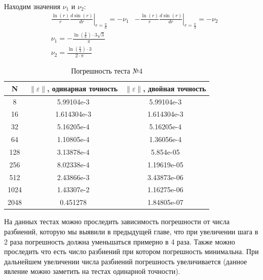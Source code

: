  Находим значения $ \nu_1 $ и $ \nu_2 $:
  \begin{align*}
		& \frac{\ln(r)}{r} \left. \frac{d\sin(r)}{dr}\right\vert_{r = \frac{\pi}{6}} = -\nu _1
		&-\frac{\ln(r)}{r} \left. \frac{d\sin(r)}{dr}\right\vert_{r = \frac{\pi}{3}} = -\nu_2 \\
    & \nu_1 = -\frac{\ln(\frac{\pi}{6}) \cdot 3\sqrt{3}}{\pi} \\
    &\nu_2 = \frac{\ln(\frac{\pi}{3})\cdot3}{2 \cdot \pi}
  \end{align*}
  \begin{table}[H]
    \centering
    \begin{tabular}{c | c | c}
      \toprule
      N & $ \left\lVert \varepsilon \right\rVert  $, одинарная точность & $ \left\lVert \varepsilon \right\rVert  $, двойная точность \\
      \midrule
      8 & 5.99104e-3 & 5.99104e-3\\
      16 & 1.614304e-3 & 1.614304e-3\\
      32 & 5.16205e-4 & 5.16205e-4\\
      64 & 1.10805e-4 & 1.36056e-4\\
      128 & 3.13878e-4 & 5.854e-05\\
      256 & 8.02338e-4 & 1.19619e-05\\
      512 & 2.43866e-3 & 3.43873e-06\\
      1024 & 1.43307e-2 & 1.16275e-06\\
      2048 & 0.451278 & 1.84805e-07\\
      \bottomrule
    \end{tabular}
    \caption{Погрешность теста №4}
  \end{table}

На данных тестах можно проследить зависимость погрешности от числа разбиений, которую мы выявили в предыдущей главе, что при увеличении шага
в 2 раза погрешность должна уменьшаться примерно в 4 раза. Также можно проследить что есть число разбиений при котором погрешность минимальна.
При дальнейшем увеличении числа разбиений погрешность увеличивается (данное явление можно заметить на тестах одинарной точности).